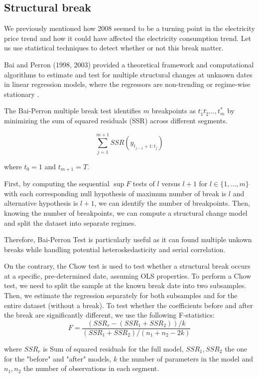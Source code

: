 \subsection{Structural break}
We previously mentioned how 2008 seemed to be a turning point in the electricity price trend and how it could have affected the electricity consumption trend. Let us use statistical techniques to detect whether or not this break matter. 

Bai and Perron (1998, 2003) provided a theoretical framework and computational algorithms to estimate and test for multiple structural changes at unknown dates in linear regression models, where the regressors are non-trending or regime-wise stationary \cite{bai1998estimating, bai2003computation}. 

The Bai-Perron multiple break test \cite{bai1998estimating} identifies $m$ breakpoints as $t_1^, t_2^, \dots, t_m^*$ by minimizing the sum of squared residuals (SSR) across different segments. 

$$\sum_{j=1}^{m+1} SSR(y_{t_{j-1}+1:t_j})$$

where $t_0 = 1$ and $t_{m+1} = T$. 

First, by computing the sequential $\sup F$ tests of $l$ versus $l+1$ for $l \in \{1, \dots, m\}$ with each corresponding null hypothesis of maximum number of break is $l$ and alternative hypothesis is $l+1$, we can identify the number of breakpoints. Then, knowing the number of breakpoints, we can compute a structural change model and split the dataset into separate regimes. 

Therefore, Bai-Perron Test is particularly useful as it can found multiple unkown breaks while handling potential heteroskedasticity and serial correlation.

On the contrary, the Chow test \cite{chow1960tests} is used to test whether a structural break occurs at a specific, pre-determined date, assuming OLS properties. To perform a Chow test, we need to split the sample at the known break date into two subsamples. Then, we estimate the regression separately for both subsamples and for the entire dataset (without a break). To test whether the coefficients before and after the break are significantly different, we use the following F-statistics:
$$F = \frac{(SSR_r - (SSR_1 + SSR_2)) / k}{(SSR_1 + SSR_2) / (n_1 + n_2 - 2k)}$$

where $SSR_r$ is Sum of squared residuals for the full model, $SSR_1, SSR_2$ the one for the "before" and "after" models, $k$ the number of parameters in the model and $n_1, n_2$ the number of observations in each segment. \\


